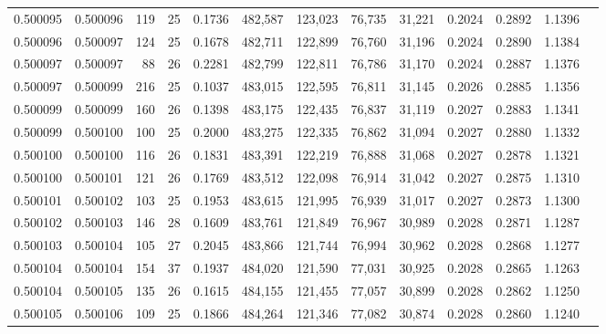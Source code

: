 \begin{tabular}{rrrrrrrrrrrrr}
0.500095 & 0.500096 & 119 &  25 &                                     0.1736 & 482,587 & 123,023 &  76,735 &  31,221 & 0.2024 & 0.2892 & 1.1396 \\
0.500096 & 0.500097 & 124 &  25 &                                     0.1678 & 482,711 & 122,899 &  76,760 &  31,196 & 0.2024 & 0.2890 & 1.1384 \\
0.500097 & 0.500097 &  88 &  26 &                                     0.2281 & 482,799 & 122,811 &  76,786 &  31,170 & 0.2024 & 0.2887 & 1.1376 \\
0.500097 & 0.500099 & 216 &  25 &                                     0.1037 & 483,015 & 122,595 &  76,811 &  31,145 & 0.2026 & 0.2885 & 1.1356 \\
0.500099 & 0.500099 & 160 &  26 &                                     0.1398 & 483,175 & 122,435 &  76,837 &  31,119 & 0.2027 & 0.2883 & 1.1341 \\
0.500099 & 0.500100 & 100 &  25 &                                     0.2000 & 483,275 & 122,335 &  76,862 &  31,094 & 0.2027 & 0.2880 & 1.1332 \\
0.500100 & 0.500100 & 116 &  26 &                                     0.1831 & 483,391 & 122,219 &  76,888 &  31,068 & 0.2027 & 0.2878 & 1.1321 \\
0.500100 & 0.500101 & 121 &  26 &                                     0.1769 & 483,512 & 122,098 &  76,914 &  31,042 & 0.2027 & 0.2875 & 1.1310 \\
0.500101 & 0.500102 & 103 &  25 &                                     0.1953 & 483,615 & 121,995 &  76,939 &  31,017 & 0.2027 & 0.2873 & 1.1300 \\
0.500102 & 0.500103 & 146 &  28 &                                     0.1609 & 483,761 & 121,849 &  76,967 &  30,989 & 0.2028 & 0.2871 & 1.1287 \\
0.500103 & 0.500104 & 105 &  27 &                                     0.2045 & 483,866 & 121,744 &  76,994 &  30,962 & 0.2028 & 0.2868 & 1.1277 \\
0.500104 & 0.500104 & 154 &  37 &                                     0.1937 & 484,020 & 121,590 &  77,031 &  30,925 & 0.2028 & 0.2865 & 1.1263 \\
0.500104 & 0.500105 & 135 &  26 &                                     0.1615 & 484,155 & 121,455 &  77,057 &  30,899 & 0.2028 & 0.2862 & 1.1250 \\
0.500105 & 0.500106 & 109 &  25 &                                     0.1866 & 484,264 & 121,346 &  77,082 &  30,874 & 0.2028 & 0.2860 & 1.1240 \\

\end{tabular}
